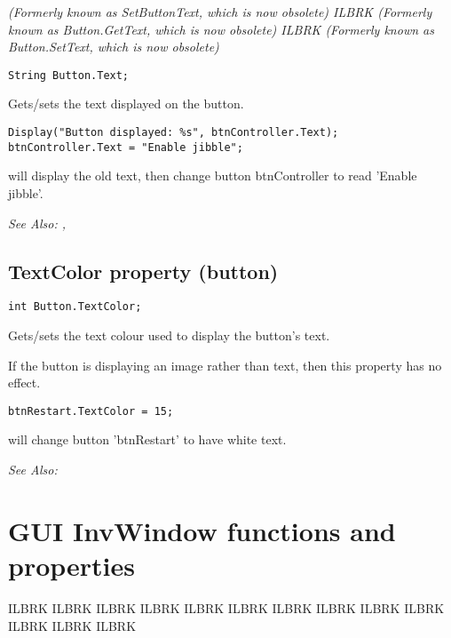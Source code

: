 \it{(Formerly known as SetButtonText, which is now obsolete)} ILBRK
\it{(Formerly known as Button.GetText, which is now obsolete)} ILBRK
\it{(Formerly known as Button.SetText, which is now obsolete)}

\begin{verbatim}
String Button.Text;
\end{verbatim}
Gets/sets the text displayed on the button.

\begin{verbatim}
Display("Button displayed: %s", btnController.Text);
btnController.Text = "Enable jibble";
\end{verbatim}
will display the old text, then change button btnController to read 'Enable jibble'.

\it{See Also:} , 


\subsection{TextColor property (button)}\label{Button.TextColor}%

\begin{verbatim}
int Button.TextColor;
\end{verbatim}
Gets/sets the text colour used to display the button's text.

If the button is displaying an image rather than text, then this property has no effect.

\begin{verbatim}
btnRestart.TextColor = 15;
\end{verbatim}
will change button 'btnRestart' to have white text.

\it{See Also:} 



\section{GUI InvWindow functions and properties}\label{GUIInvFuncs}%

ILBRK
ILBRK
ILBRK
ILBRK
ILBRK
ILBRK
ILBRK
ILBRK
ILBRK
ILBRK
ILBRK
ILBRK
ILBRK


